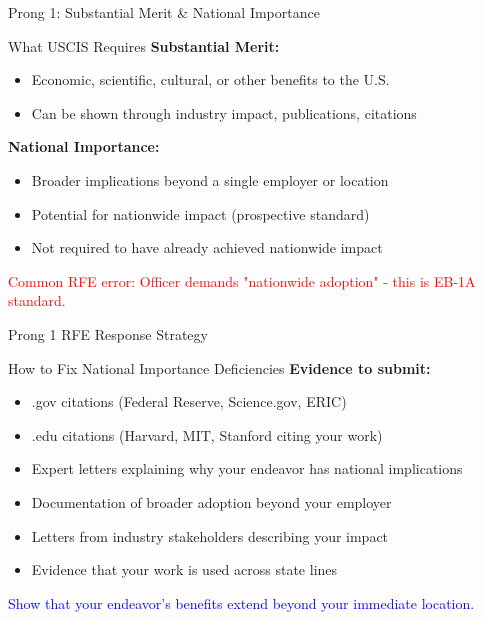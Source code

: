 \documentclass[11pt]{beamer}
\begin{document}
	
	\begin{frame}{Prong 1: Substantial Merit \& National Importance}
		\scriptsize
		\begin{block}{What USCIS Requires}
			\textbf{Substantial Merit:}
			\begin{itemize}
				\item Economic, scientific, cultural, or other benefits to the U.S.
				\item Can be shown through industry impact, publications, citations
			\end{itemize}
			\textbf{National Importance:}
			\begin{itemize}
				\item Broader implications beyond a single employer or location
				\item Potential for nationwide impact (prospective standard)
				\item Not required to have already achieved nationwide impact
			\end{itemize}
			\textcolor{red}{Common RFE error: Officer demands "nationwide adoption" - this is EB-1A standard.}
		\end{block}
	\end{frame}
	
	\begin{frame}{Prong 1 RFE Response Strategy}
		\scriptsize
		\begin{block}{How to Fix National Importance Deficiencies}
			\textbf{Evidence to submit:}
			\begin{itemize}
				\item .gov citations (Federal Reserve, Science.gov, ERIC)
				\item .edu citations (Harvard, MIT, Stanford citing your work)
				\item Expert letters explaining why your endeavor has national implications
				\item Documentation of broader adoption beyond your employer
				\item Letters from industry stakeholders describing your impact
				\item Evidence that your work is used across state lines
			\end{itemize}
			\textcolor{blue}{Show that your endeavor's benefits extend beyond your immediate location.}
		\end{block}
	\end{frame}
	
\end{document}
